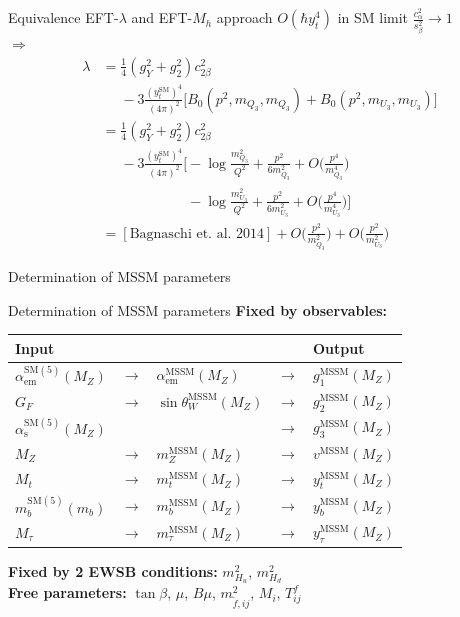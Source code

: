 \documentclass[hyperref={pdfpagelabels=false},ngerman]{beamer}
\renewcommand{\emph}{\textbf}
\newcommand{\SM}{\ensuremath{\text{SM}}}
\newcommand{\MSSM}{\ensuremath{\text{MSSM}}}
\begin{document}
\begin{frame}[noframenumbering]{Equivalence EFT-$\lambda$ and EFT-$M_h$ approach $O(\hbar y_t^4)$}
  in SM limit $\frac{c^2_\alpha}{s^2_\beta} \rightarrow 1$\\
  $\Rightarrow$ 
  \begin{align*}
    \lambda &= \frac{1}{4} (g_Y^2 + g_2^2) c_{2\beta}^2\\
    &\phantom{={}}
    - 3 \frac{(y_t^\SM)^4}{(4\pi)^2} \Big[
    B_0(p^2,m_{Q_3},m_{Q_3}) + B_0(p^2,m_{U_3},m_{U_3}) \Big]\\
    &=
    \frac{1}{4} (g_Y^2 + g_2^2) c_{2\beta}^2\\
    &\phantom{={}} - 3 \frac{(y_t^\SM)^4}{(4\pi)^2} \Big[
    -\log\frac{m^2_{Q_3}}{Q^2} + \frac{p^2}{6m^2_{Q_3}} + O\Big(\frac{p^4}{m^4_{Q_3}}\Big)\\
    &\phantom{={} - 3 \frac{(y_t^\SM)^4}{(4\pi)^2} \Big[}
    - \log\frac{m^2_{U_3}}{Q^2} + \frac{p^2}{6m^2_{U_3}} + O\Big(\frac{p^4}{m^4_{U_3}}\Big) \Big]\\
    &= [\text{Bagnaschi et.\ al. 2014}]
    + O\Big(\frac{p^2}{m^2_{Q_3}}\Big)
    + O\Big(\frac{p^2}{m^2_{U_3}}\Big)
  \end{align*}
\end{frame}

\begin{frame}[noframenumbering]
  \begin{center}
    \Large Determination of MSSM parameters
  \end{center}
\end{frame}

\begin{frame}[noframenumbering]{Determination of MSSM parameters}
  \emph{Fixed by observables:}
  \begin{table}
    \centering
    \begin{tabular}{lllll}
      Input & & & & Output \\
      \midrule
      $\alpha_\text{em}^{\SM(5)}(M_Z)$ & $\rightarrow$ & $\alpha_\text{em}^\MSSM(M_Z)$ & $\rightarrow$ & $g_1^\MSSM(M_Z)$ \\
      $G_F$ & $\rightarrow$ & $\sin\theta_W^\MSSM(M_Z)$ & $\rightarrow$ & $g_2^\MSSM(M_Z)$ \\
      $\alpha_\text{s}^{\SM(5)}(M_Z)$ & & & $\rightarrow$ & $g_3^\MSSM(M_Z)$ \\
      $M_Z$ & $\rightarrow$ & $m_Z^\MSSM(M_Z)$ & $\rightarrow$ & $v^\MSSM(M_Z)$ \\
      $M_t$ & $\rightarrow$ & $m_t^\MSSM(M_Z)$ & $\rightarrow$ & $y_t^\MSSM(M_Z)$ \\
      $m_b^{\SM(5)}(m_b)$ & $\rightarrow$ & $m_b^\MSSM(M_Z)$ & $\rightarrow$ & $y_b^\MSSM(M_Z)$ \\
      $M_\tau$ & $\rightarrow$ & $m_\tau^\MSSM(M_Z)$ & $\rightarrow$ & $y_\tau^\MSSM(M_Z)$ \\
    \end{tabular}
  \end{table}
  \emph{Fixed by 2 EWSB conditions:} $m^2_{H_u}$, $m^2_{H_d}$ \\[1em]
  \emph{Free parameters:} $\tan\beta$, $\mu$, $B\mu$, $m_{\tilde{f},ij}^2$, $M_i$,
  $T^f_{ij}$
\end{frame}
\end{document}
